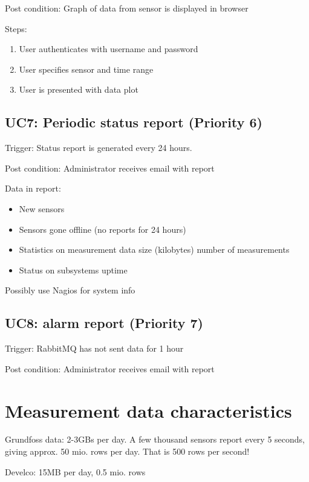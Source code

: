 \noindent Post condition: Graph of data from sensor is displayed in browser

\noindent Steps: 
\begin{enumerate}
    \item User authenticates with username and password
    \item User specifies sensor and time range
    \item User is presented with data plot
\end{enumerate}

\subsection*{UC7: Periodic status report (Priority 6)}
\noindent Trigger: Status report is generated every 24 hours.

\noindent Post condition: Administrator receives email with report

\noindent Data in report: 
\begin{itemize}
    \item New sensors
    \item Sensors gone offline (no reports for 24 hours)
    \item Statistics on measurement data
        \subitem size (kilobytes)
        \subitem number of measurements
    \item Status on subsystems 
        \subitem uptime
\end{itemize}
Possibly use Nagios for system info


\subsection*{UC8: alarm report (Priority 7)}
\noindent Trigger: RabbitMQ has not sent data for 1 hour

\noindent Post condition: Administrator receives email with report

\section{Measurement data characteristics}
Grundfoss data: 2-3GBs per day. A few thousand sensors report every 5 seconds, giving approx. 50 mio. rows per day. That is 500 rows per second!

Develco: 15MB per day, 0.5 mio. rows
